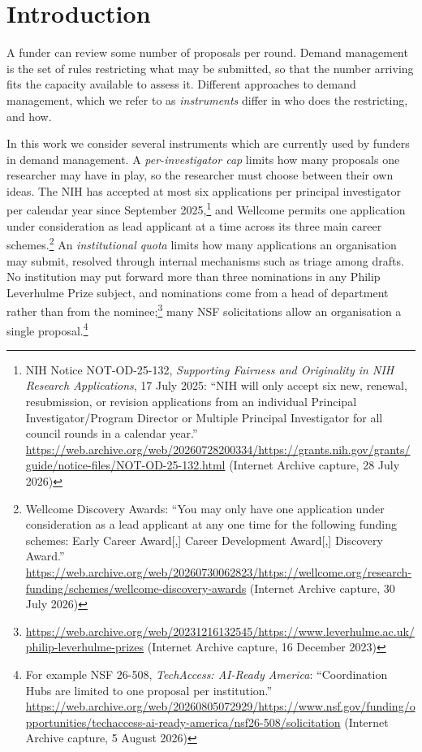 \documentclass[11pt,a4paper]{article}
\newcommand{\wa}[2]{\url{#1} (Internet Archive capture, #2)}
\begin{document}
\section{Introduction}

A funder can review some number of proposals per round. Demand management is the
set of rules restricting what may be submitted, so that the number arriving fits
the capacity available to assess it. Different approaches to demand management, which we refer to as \emph{instruments} differ in who does the restricting, and how.

In this work we consider several instruments which are currently used by funders in demand management.
A \emph{per-investigator cap} limits how many proposals one researcher may have
in play, so the researcher must choose between their own ideas. The NIH has
accepted at most six applications per principal investigator per calendar year
since September 2025,\footnote{NIH Notice NOT-OD-25-132, \emph{Supporting Fairness
and Originality in NIH Research Applications}, 17 July 2025: ``NIH will only
accept six new, renewal, resubmission, or revision applications from an individual
Principal Investigator/Program Director or Multiple Principal Investigator for all
council rounds in a calendar year.''
\wa{https://web.archive.org/web/20260728200334/https://grants.nih.gov/grants/guide/notice-files/NOT-OD-25-132.html}{28 July 2026}}
and Wellcome permits one application under consideration as lead applicant at a
time across its three main career schemes.\footnote{Wellcome Discovery Awards:
``You may only have one application under consideration as a lead applicant at any
one time for the following funding schemes: Early Career Award[,] Career
Development Award[,] Discovery Award.''
\wa{https://web.archive.org/web/20260730062823/https://wellcome.org/research-funding/schemes/wellcome-discovery-awards}{30 July 2026}}
An \emph{institutional quota} limits how many applications an organisation may submit, resolved
through internal mechanisms such as triage among drafts. No institution may put
forward more than three nominations in any Philip Leverhulme Prize subject, and
nominations come from a head of department rather than from the
nominee;\footnote{\wa{https://web.archive.org/web/20231216132545/https://www.leverhulme.ac.uk/philip-leverhulme-prizes}{16 December 2023}}
many NSF solicitations allow an organisation a single
proposal.\footnote{For example NSF 26-508, \emph{TechAccess: AI-Ready America}:
``Coordination Hubs are limited to one proposal per institution.''
\wa{https://web.archive.org/web/20260805072929/https://www.nsf.gov/funding/opportunities/techaccess-ai-ready-america/nsf26-508/solicitation}{5 August 2026}}
\end{document}
